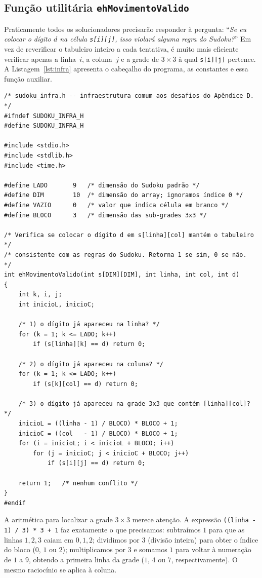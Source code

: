 \documentclass[11pt,a4paper,oneside]{report}
\newcommand{\codigo}[1]{\texttt{\color{deitelblue}#1}}
\begin{document}
\subsection{Função utilitária \texttt{ehMovimentoValido}}

Praticamente todos os solucionadores precisarão responder à pergunta:
``\emph{Se eu colocar o dígito $d$ na célula \codigo{s[i][j]}, isso violará
alguma regra do Sudoku?}'' Em vez de reverificar o tabuleiro inteiro a cada
tentativa, é muito mais eficiente verificar apenas a linha~$i$, a coluna~$j$
e a grade de $3 \times 3$ à qual \codigo{s[i][j]} pertence. A
Listagem~\ref{lst:infra} apresenta o cabeçalho do programa, as constantes
e essa função auxiliar.

\begin{lstlisting}[caption={Macros, cabeçalhos e a função \texttt{ehMovimentoValido}.},label={lst:infra}]
/* sudoku_infra.h -- infraestrutura comum aos desafios do Apêndice D. */
#ifndef SUDOKU_INFRA_H
#define SUDOKU_INFRA_H

#include <stdio.h>
#include <stdlib.h>
#include <time.h>

#define LADO       9   /* dimensão do Sudoku padrão */
#define DIM        10  /* dimensão do array; ignoramos índice 0 */
#define VAZIO      0   /* valor que indica célula em branco */
#define BLOCO      3   /* dimensão das sub-grades 3x3 */

/* Verifica se colocar o dígito d em s[linha][col] mantém o tabuleiro */
/* consistente com as regras do Sudoku. Retorna 1 se sim, 0 se não.   */
int ehMovimentoValido(int s[DIM][DIM], int linha, int col, int d)
{
    int k, i, j;
    int inicioL, inicioC;

    /* 1) o dígito já apareceu na linha? */
    for (k = 1; k <= LADO; k++)
        if (s[linha][k] == d) return 0;

    /* 2) o dígito já apareceu na coluna? */
    for (k = 1; k <= LADO; k++)
        if (s[k][col] == d) return 0;

    /* 3) o dígito já apareceu na grade 3x3 que contém [linha][col]? */
    inicioL = ((linha - 1) / BLOCO) * BLOCO + 1;
    inicioC = ((col   - 1) / BLOCO) * BLOCO + 1;
    for (i = inicioL; i < inicioL + BLOCO; i++)
        for (j = inicioC; j < inicioC + BLOCO; j++)
            if (s[i][j] == d) return 0;

    return 1;   /* nenhum conflito */
}
#endif
\end{lstlisting}

A aritmética para localizar a grade $3 \times 3$ merece atenção. A expressão
\codigo{((linha - 1) / 3) * 3 + 1} faz exatamente o que precisamos: subtraímos
$1$ para que as linhas $1, 2, 3$ caiam em $0, 1, 2$; dividimos por $3$ (divisão
inteira) para obter o índice do bloco ($0$, $1$ ou $2$); multiplicamos por $3$
e somamos $1$ para voltar à numeração de $1$ a $9$, obtendo a primeira linha
da grade ($1$, $4$ ou $7$, respectivamente). O mesmo raciocínio se aplica à
coluna.
\end{document}
